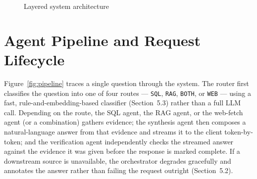 \documentclass[11pt,a4paper,oneside]{report}
\begin{document}
\begin{figure}[h]
\caption{Layered system architecture}
\label{fig:arch}
\end{figure}

\section{Agent Pipeline and Request Lifecycle}

Figure~\ref{fig:pipeline} traces a single question through the system.
The router first classifies the question into one of four routes ---
\texttt{SQL}, \texttt{RAG}, \texttt{BOTH}, or \texttt{WEB} --- using a fast,
rule-and-embedding-based classifier (Section~5.3) rather than a full LLM call.
Depending on the route, the SQL agent, the RAG agent, or the web-fetch agent
(or a combination) gathers evidence; the synthesis agent then composes a
natural-language answer from that evidence and streams it to the client
token-by-token; and the verification agent independently checks the streamed
answer against the evidence it was given before the response is marked
complete. If a downstream source is unavailable, the orchestrator degrades
gracefully and annotates the answer rather than failing the request outright
(Section~5.2).
\end{document}
